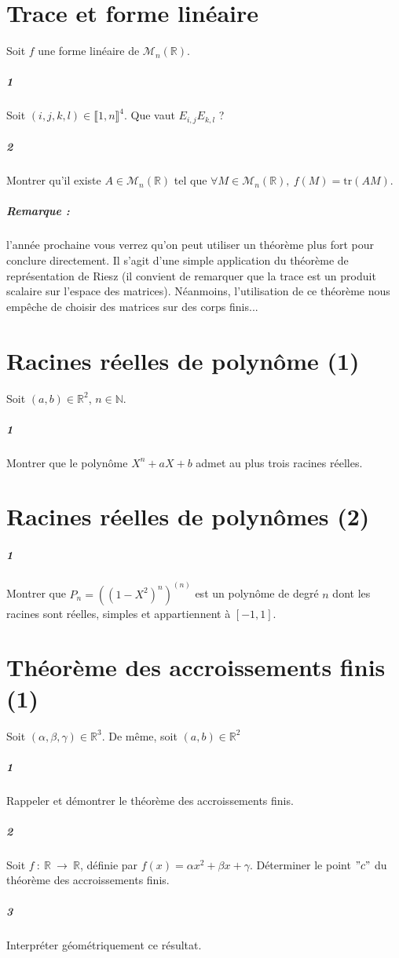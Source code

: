 \documentclass[10pt,a4paper]{article}
\begin{document}
\section{Trace et forme linéaire}
Soit $f$ une forme linéaire de $\mathcal{M}_n \left( \mathbb{R} \right)$.
\subparagraph{1}Soit $(i,j,k,l) \in \llbracket 1,n\rrbracket^4$. Que vaut $E_{i,j}E_{k,l}$ ?
\subparagraph{2}Montrer qu'il existe $A \in \mathcal{M}_n\left( \mathbb{R} \right)$ tel que $\forall M \in\mathcal{M}_n \left( \mathbb{R} \right), \ f(M) = \text{tr} (AM)$.
\subparagraph{Remarque :} l'année prochaine vous verrez qu'on peut utiliser un théorème plus fort pour conclure directement. Il s'agit d'une simple application du théorème de représentation de Riesz (il convient de remarquer que la trace est un produit scalaire sur l'espace des matrices). Néanmoins, l'utilisation de ce théorème nous empêche de choisir des matrices sur des corps finis...

\section{Racines réelles de polynôme (1)}
Soit $(a,b) \in \mathbb{R}^2$, $n \in \mathbb{N}$.
\subparagraph{1}Montrer que le polynôme $X^n+aX+b$ admet au plus trois racines réelles.

\section{Racines réelles de polynômes (2)}
\subparagraph{1}Montrer que $P_n=((1-X^2)^n)^{(n)}$ est un polynôme de degré $n$ dont les racines sont réelles, simples et appartiennent à $[-1,1]$.

\section{Théorème des accroissements finis (1)}
Soit $(\alpha,\beta,\gamma) \in \mathbb{R}^3$. De même, soit $(a,b) \in \mathbb{R}^2$
\subparagraph{1}Rappeler et démontrer le théorème des accroissements finis.
\subparagraph{2}Soit $f \ : \ \mathbb{R} \ \rightarrow \ \mathbb{R}$, définie par $f(x)=\alpha x^2+\beta x +\gamma$. Déterminer le point $"c"$ du théorème des accroissements finis.
\subparagraph{3}Interpréter géométriquement ce résultat.
\end{document}

